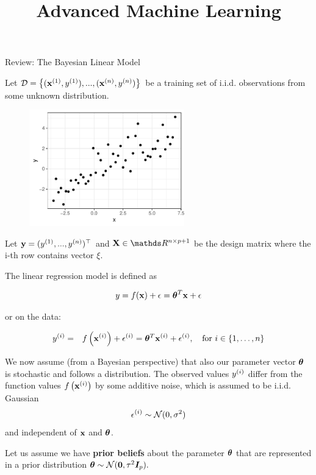 \documentclass[11pt,compress,t,notes=noshow, xcolor=table]{beamer}
\title{Advanced Machine Learning}
\date{}
\begin{document}


\begin{vbframe}{Review: The Bayesian Linear Model}

    Let $\D = \left\{(\xi[1], \yi[1]), ..., (\xi[n], \yi[n])\right\}$ be a training set of i.i.d. observations from some unknown distribution.

    \begin{figure}
      \includegraphics[width=0.6\textwidth]{figure/bayes_lm/example.pdf}
    \end{figure}

    Let $\yv = (\yi[1], ..., \yi[n])^\top$ and $\Xmat \in \R^{n \times p+1}$ be the design matrix where the i-th row contains vector $\xi$.  
    
    \framebreak

    The linear regression model is defined as

    $$
    y = \fx + \epsilon = \thetab^T \xv + \epsilon 
    $$

    or on the data:

    \begin{eqnarray*}
    \yi &=& \fxi + \epsi = \thetab^T \xi + \epsi, \quad \text{for } i \in \{1, \ldots, n\}
    \end{eqnarray*}
    

    We now assume (from a Bayesian perspective) that also our parameter vector $\thetab$ is stochastic and follows a distribution.
    The observed values $\yi$ differ from the function values $\fxi$ by some additive noise, which is assumed to be i.i.d. Gaussian 
    $$
    \epsi \sim \mathcal{N}(0, \sigma^2)$$
    and independent of $\xv$ and $\thetab$.

    \framebreak

    Let us assume we have \textbf{prior beliefs} about the parameter $\thetab$ that are represented in a prior distribution $\thetab \sim \mathcal{N}(\zero, \tau^2 \id_p).$


\end{vbframe}
\end{document}
